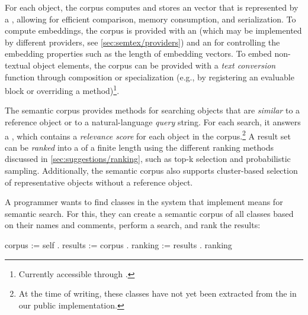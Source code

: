 For each object, the corpus computes and stores an  vector that is represented by a , allowing for efficient comparison, memory consumption, and serialization.
To compute embeddings, the corpus is provided with an  (which may be implemented by different providers, see \cref{sec:semtex/providers}) and an  for controlling the embedding properties such as the length of embedding vectors.
To embed non-textual object elements, the corpus can be provided with a \emph{text conversion} function through composition or specialization (e.g., by registering an evaluable block or overriding a method)\footnote{Currently accessible through .}.

The semantic corpus provides methods for searching objects that are \emph{similar} to a reference object or to a natural-language \emph{query} string.
For each search, it answers a , which contains a \emph{relevance score} for each object in the corpus.\footnote{At the time of writing, these classes have not yet been extracted from the  in our public implementation.}
A result set can be \emph{ranked} into a  of a finite length using the different ranking methods discussed in \cref{sec:suggestions/ranking}, such as top-k selection and probabilistic sampling.
Additionally, the semantic corpus also supports cluster-based selection of representative objects without a reference object.

\begin{example}[5]
	A programmer wants to find classes in the system that implement means for semantic search.
	For this, they can create a semantic corpus of all classes based on their names and comments, perform a search, and rank the results:

	\begin{multicode}
		corpus := self   \newline
		\null\qquad	{}  \newline
		\null\qquad	{} . \newline
		results := corpus  . \newline
		ranking := results  . \newline
		ranking 
	\end{multicode}
\end{example}

